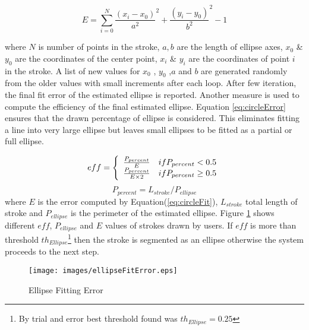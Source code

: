 \begin{equation}
E = \sum\limits_{i = 0}^N {\frac{{(x_i - x_0 )}}{{a^2 }}^2  + \frac{{(y_i - y_0 )}}{{b^2 }}^2  - 1} 
\label{eq:circleFit}
\end{equation}

 where $N$ is number of points in the stroke, $a,b$ are the length of ellipse axes, $x_0$ \& $y_0$ are the coordinates of the center point, $x_i$ \& $y_i$ are the coordinates of point $i$ in the stroke. A list of new values for $x_0$ , $y_0$ ,$a$ and $b$ are generated randomly from the older values with small increments after each loop.  After few iteration, the final fit error of the estimated ellipse is reported. Another measure is used to compute the efficiency of the final estimated ellipse. Equation \ref{eq:circleError} ensures that the drawn percentage of ellipse is considered. This eliminates fitting a  line into very large ellipse but leaves small ellipses to be fitted as a partial or full ellipse. 


  \begin{equation}
eff = \left\{ {\begin{array}{*{20}c}
   {\frac{{P_{percent} }}{E}} & {ifP_{percent}  < 0.5}  \\
   {\frac{{P_{percent} }}{{E \times 2}}} & {ifP_{percent}  \ge 0.5}  \\
\end{array}} \right.
\label{eq:circleError}
\end{equation}
 \begin{equation}
P_{percent}  = L_{stroke} /P_{ellipse} 
\label{eq:ErrorArea}
\end{equation}
where $E$ is the error computed by Equation(\ref{eq:circleFit}), $L_{stroke}$ total length of stroke and $P_{ellipse}$ is the perimeter of the estimated ellipse. Figure \ref{fig:ellipseFitExamples} shows different $eff$, $P_{ellipse}$  and  $E$ values of strokes drawn by users.  If $eff$ is more than threshold $th_{Ellipse}$\footnote{By trial and error best threshold found was $th_{Ellipse}=0.25$} then the stroke is segmented as an ellipse otherwise the system proceeds to the next step. 

\begin{figure}
	\centering
		\texttt{[image: images/ellipseFitError.eps]}
	\caption{Ellipse Fitting Error}
	\label{fig:ellipseFitExamples}
\end{figure}


